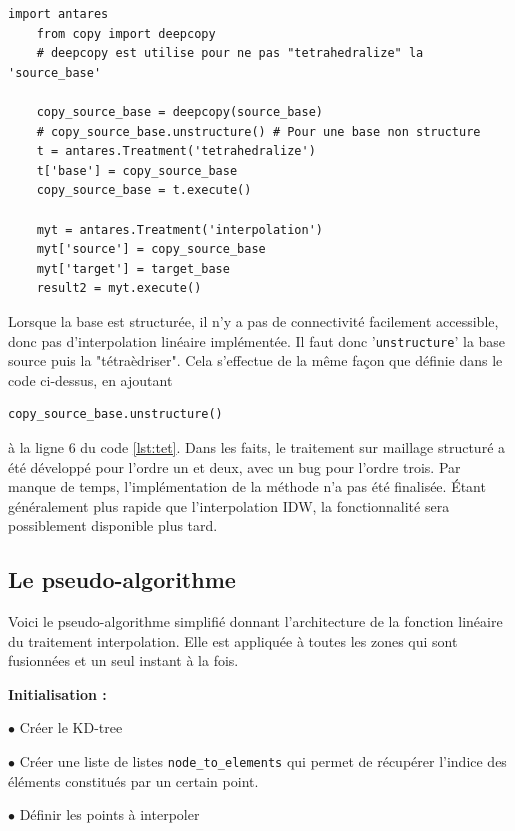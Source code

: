 \begin{lstlisting}[caption=Utilisation du traiement "tetrahedralize" pour interpoler linéairement tous types de cellules, label={lst:tet}]
    import antares
    from copy import deepcopy
    # deepcopy est utilise pour ne pas "tetrahedralize" la 'source_base' 
    
    copy_source_base = deepcopy(source_base)
    # copy_source_base.unstructure() # Pour une base non structure
    t = antares.Treatment('tetrahedralize')
    t['base'] = copy_source_base
    copy_source_base = t.execute()

    myt = antares.Treatment('interpolation')
    myt['source'] = copy_source_base
    myt['target'] = target_base
    result2 = myt.execute()
\end{lstlisting}

Lorsque la base est structurée, il n'y a pas de connectivité facilement accessible, donc pas d'interpolation linéaire implémentée. Il faut donc '\texttt{unstructure}' la base source puis la "tétraèdriser". Cela s'effectue de la même façon que définie dans le code ci-dessus, en ajoutant 
\begin{lstlisting}[]
    copy_source_base.unstructure()
\end{lstlisting}
à la ligne 6 du code \ref{lst:tet}. Dans les faits, le traitement sur maillage structuré a été développé pour l'ordre un et deux, avec un bug pour l'ordre trois. Par manque de temps, l'implémentation de la méthode n'a pas été finalisée. Étant généralement plus rapide que l'interpolation IDW, la fonctionnalité sera possiblement disponible plus tard.


\newpage
\subsection{Le pseudo-algorithme}

Voici le pseudo-algorithme simplifié donnant l'architecture de la fonction linéaire du traitement interpolation. Elle est appliquée à toutes les zones qui sont fusionnées et un seul instant à la fois.

\vspace{0.3cm}

\textbf{Initialisation :}

$\bullet$ Créer le KD-tree

$\bullet$ Créer une liste de listes \texttt{node\_to\_elements} qui permet de récupérer l'indice des éléments constitués par un certain point.

$\bullet$ Définir les points à interpoler

